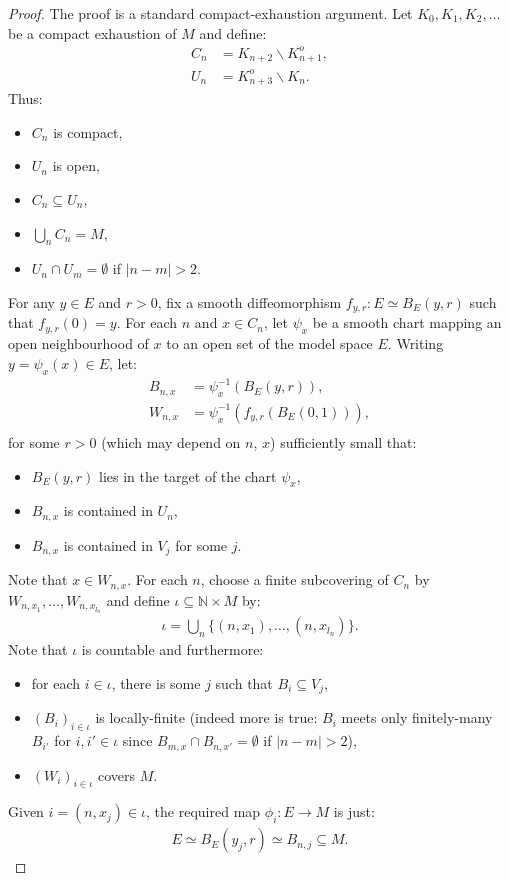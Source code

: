 \begin{proof}
  The proof is a standard compact-exhaustion argument.
  Let $K_0, K_1, K_2, \ldots $ be a compact exhaustion of $M$ and define:
  \begin{align*}
    C_n &= K_{n+2} \smallsetminus K_{n+1}^o,\\
    U_n &= K_{n+3}^o \smallsetminus K_n.
  \end{align*}
  Thus:
  \begin{itemize}
    \item $C_n$ is compact,
    \item $U_n$ is open,
    \item $C_n \subseteq U_n$,
    \item $\bigcup_n C_n = M$,
    \item $U_n \cap U_m = \emptyset$ if $|n - m| > 2$.
  \end{itemize}
  For any $y \in E$ and $r > 0$, fix a smooth diffeomorphism $f_{y,r} : E \simeq B_E(y, r)$ such
  that $f_{y,r}(0) = y$.
  For each $n$ and $x \in C_n$, let $\psi_x$  be a smooth chart mapping an open
  neighbourhood of $x$ to an open set of the model space $E$.
  Writing $y = \psi_x (x) \in E$, let:
  \begin{align*}
    B_{n, x} &= \psi_x^{-1} (B_E(y, r)),\\
    W_{n, x} &= \psi_x^{-1} (f_{y,r} (B_E (0, 1))),\\
  \end{align*}
  for some $r > 0$ (which may depend on $n$, $x$) sufficiently small that:
  \begin{itemize}
    \item $B_E(y, r)$ lies in the target of the chart $\psi_x$,
    \item $B_{n,x}$ is contained in $U_n$,
    \item $B_{n,x}$ is contained in $V_j$ for some $j$.
  \end{itemize}
  Note that $x \in W_{n,x}$. For each $n$, choose a finite subcovering of $C_n$ by
  $W_{n, x_1}, \ldots, W_{n, x_{l_n}}$ and define $\iota \subseteq ℕ \times M$ by:
  \begin{align*}
    \iota = \bigcup_n \{ (n, x_1), \ldots, (n, x_{l_n}) \} .
  \end{align*}
  Note that $\iota$ is countable and furthermore:
  \begin{itemize}
    \item for each $i \in \iota$, there is some $j$ such that $B_i \subseteq V_j$,
    \item $(B_i)_{i \in \iota}$ is locally-finite
    (indeed more is true: $B_i$ meets only finitely-many $B_{i'}$ for $i, i' \in \iota$
    since $B_{m, x} \cap B_{n, x'} = \emptyset$ if $|n - m| > 2$),
    \item $(W_i)_{i \in \iota}$ covers $M$.
  \end{itemize}
  Given $i = (n, x_j) \in \iota$, the required map $\phi_i : E \to M$ is just:
  \begin{align*}
    E \simeq B_E(y_j, r) \simeq B_{n,j} \subseteq M.
  \end{align*}
\end{proof}

